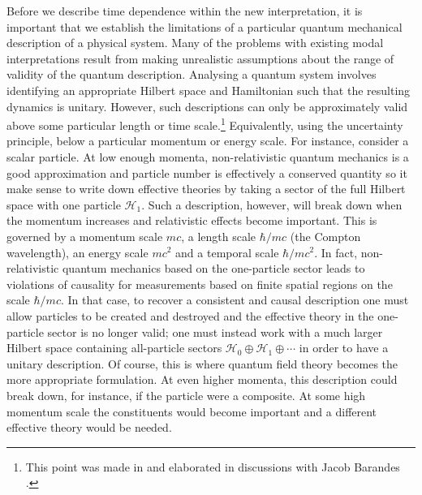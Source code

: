 \documentclass[%
preprint,
nofootinbib,
 amsmath,amssymb,
aps,
]{revtex4-1}
\def\BH{{\mathscr H}}
\begin{document}
Before we describe time dependence within the new interpretation, it is important that we establish the limitations of a particular quantum mechanical description of a physical system. Many of the problems with existing modal interpretations result from making unrealistic assumptions about the range of validity of the quantum description. Analysing a quantum system involves 
identifying an appropriate Hilbert space and Hamiltonian such that the resulting dynamics is unitary. However, such descriptions can only be approximately valid above some particular
length or time scale.\footnote{This point was made in \cite{Hollowood:2013cbr} and elaborated in discussions with Jacob Barandes \cite{JB}.} Equivalently, using the uncertainty principle, below a particular momentum or energy scale. For instance, consider a scalar particle. At low enough momenta, non-relativistic quantum mechanics is a good approximation and particle number is effectively a conserved quantity so it make sense to write down effective theories by taking a sector of the full Hilbert space with one particle $\BH_1$. Such a description, however, will break down when the momentum increases and relativistic effects become important. This is governed by a momentum scale $mc$, a length scale $\hbar/mc$ (the Compton wavelength), an energy scale $mc^2$ and a temporal scale $\hbar/mc^2$. In fact, non-relativistic quantum mechanics based on the one-particle sector leads to violations of causality for measurements based on finite spatial regions on the scale $\hbar/mc$. 
In that case, to recover a consistent and causal description one must allow particles to be created and destroyed and the  effective theory in the one-particle sector is no longer valid; one must instead work with a much larger Hilbert space containing all-particle sectors $\BH_0\oplus\BH_1\oplus\cdots$ in order to have a unitary description. Of course, this is where quantum field theory becomes the more appropriate formulation.
At even higher momenta, this description could break down, for instance, if the particle were a composite. At some high momentum scale the constituents would become important and a different effective theory would be needed.
\end{document}

